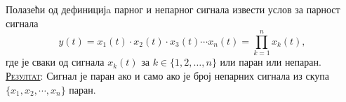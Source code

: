 \noindent
\PID 
Полазећи од дефиницијa парног и непарног сигнала
извести услов за парност сигнала
$$
	y(t) = x_1(t) \cdot x_2(t) \cdot x_3(t) \cdots x_n(t) = 
	\prod_{k = 1}^n x_k(t),
$$
где је сваки од сигнала $x_k(t)$ за $k \in \{1,2,\ldots,n\}$
или паран или непаран.
\\[2mm]

\textsc{\underline{Резултат}}: 
Сигнал је паран ако и само ако је број непарних сигнала из скупа $\{
x_1, x_2, \cdots, x_n\}$ паран. \\[5mm]

